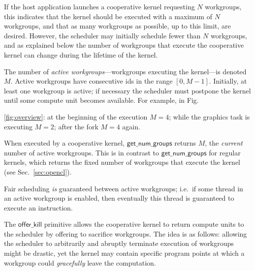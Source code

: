 \documentclass[sigconf]{acmart}
\newcommand{\myfig}{Fig.~}
\newcommand{\mysec}{Sec.~}
\newcommand{\offerkill}{\mathsf{offer\_kill}}
\newcommand{\getnumgroups}{\mathsf{get\_num\_groups}}
\begin{document}
%
If the host application launches a cooperative kernel requesting $N$
workgroups, this indicates that the kernel should be executed with a
maximum of $N$ workgroups, and that as many workgroups as possible, up
to this limit, are desired.  However, the scheduler may initially
schedule fewer than $N$ workgroups, and as explained below the number
of workgroups that execute the cooperative kernel can change during
the lifetime of the kernel.

The number of \emph{active workgroups}---workgroups executing the
kernel---is denoted $M$.  Active workgroups have consecutive ids in
the range $[0, M-1]$.  Initially, at least one workgroup is active; if
necessary the scheduler must postpone the kernel until some compute
unit becomes available. For example, in \myfig{\ref{fig:overview}: at the
  beginning of the execution $M = 4$; while the graphics task is
  executing $M = 2$; after the fork $M = 4$ again.

When executed by a cooperative
kernel, $\getnumgroups$ returns $M$, the \emph{current} number of
active workgroups.  This is in contrast to $\getnumgroups$ for
regular kernels, which returns the fixed number of workgroups that execute the kernel (see \mysec\ref{sec:opencl}).

Fair scheduling \emph{is} guaranteed between active workgroups;
i.e.\ if some thread in an active workgroup is enabled, then
eventually this thread is guaranteed to execute an instruction.


\myparagraph{Semantics for $\offerkill$}
%
The $\offerkill$ primitive allows the cooperative kernel to return
compute units to the scheduler by offering to sacrifice workgroups.
The idea is as follows: allowing the scheduler to arbitrarily and abruptly terminate execution
of workgroups might be drastic, yet the kernel
may contain specific program points at which a workgroup could
\emph{gracefully} leave the computation.

}
\end{document}
